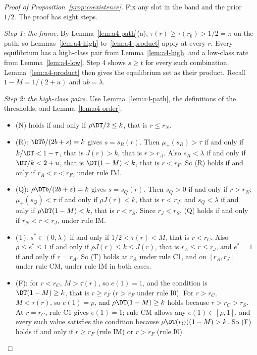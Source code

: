 \begin{proof}[Proof of Proposition~\ref{prop:coexistence}]
Fix any slot in the band and the prior \(1/2\). The proof has eight steps.

\emph{Step 1: the frame.} By Lemma~\ref{lem:a4-path}(a), \(\tau(r)\ge\tau(r_0)>1/2=\pi\) on the path, so
Lemmas~\ref{lem:a4-high} to~\ref{lem:a4-product} apply at every \(r\). Every equilibrium has a high-class pair
from Lemma~\ref{lem:a4-high} and a low-class rate from Lemma~\ref{lem:a4-low}. Step 4 shows \(s\ge t\) for every
such combination. Lemma~\ref{lem:a4-product} then gives the equilibrium set as their product. Recall
\(1-M=1/(2+u)\) and \(ub=\lambda\).

\emph{Step 2: the high-class pairs.} Use Lemma~\ref{lem:a4-path}, the definitions of the thresholds, and
Lemma~\ref{lem:a4-order}.
\begin{itemize}[leftmargin=2em]
\item (N) holds if and only if \(\rho\DT/2\le k\), that is \(r\le r_N\).
\item (R): \(\DT b/(2b+s)=k\) gives \(s=s_R(r)\). Then \(\mu_+(s_R)>\tau\) if and only if \(k/\DT<1-\tau\), that is
\(J(r)>k\), that is \(r>r_A\). Also \(s_R<\lambda\) if and only if \(\DT/k<2+u\), that is \(\DT(1-M)<k\), that is
\(r<r_F\). So (R) holds if and only if \(r_A<r<r_F\), under rule IM.
\item (Q): \(\rho\DT b/(2b+s)=k\) gives \(s=s_Q(r)\). Then \(s_Q>0\) if and only if \(r>r_N\); \(\mu_+(s_Q)<\tau\) if
and only if \(\rho J(r)<k\), that is \(r<r_J\); and \(s_Q<\lambda\) if and only if \(\rho\DT(1-M)<k\), that is
\(r<r_S\). Since \(r_J<r_S\), (Q) holds if and only if \(r_N<r<r_J\), under rule IM.
\item (T): \(s^*\in(0,\lambda)\) if and only if \(1/2<\tau(r)<M\), that is \(r<r_C\). Also \(\rho\le e^*\le1\) if and
only if \(\rho J(r)\le k\le J(r)\), that is \(r_A\le r\le r_J\), and \(e^*=1\) if and only if \(r=r_A\). So (T)
holds at \(r_A\) under rule C1, and on \([r_A,r_J]\) under rule CM, under rule IM in both cases.
\item (F): for \(r<r_C\), \(M>\tau(r)\), so \(e(1)=1\), and the condition is \(\DT(1-M)\ge k\), that is \(r\ge r_F\)
(\(r>r_F\) under rule I0). For \(r>r_C\), \(M<\tau(r)\), so \(e(1)=\rho\), and \(\rho\DT(1-M)\ge k\) holds because
\(r>r_C>r_S\). At \(r=r_C\), rule C1 gives \(e(1)=1\); rule CM allows any \(e(1)\in[\rho,1]\), and every such value
satisfies the condition because \(\rho\DT(r_C)(1-M)>k\). So (F) holds if and only if \(r\ge r_F\) (rule IM) or
\(r>r_F\) (rule I0).
\end{itemize}


\end{proof}
